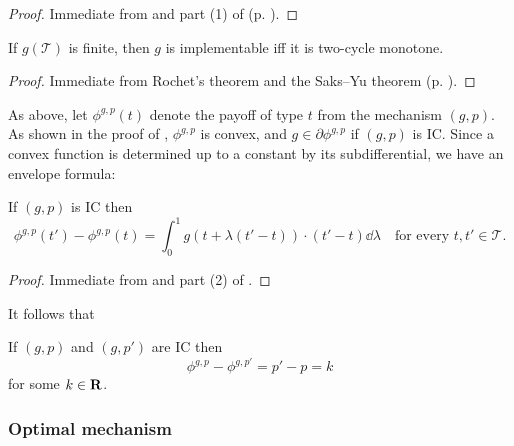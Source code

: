 \documentclass[11pt,letterpaper,reqno,oneside]{article}
\begin{document}
\begin{proof}
	Immediate from  and part (1) of  (p. \pageref{theorem:convex_FTC}).
\end{proof}


\begin{corollary}
	\label{theorem:implementable_monotone_2cycle}
	If $g(\mathcal{T})$ is finite, then $g$ is implementable iff it is two-cycle monotone.
\end{corollary}

\begin{proof}
	Immediate from Rochet's theorem and the Saks--Yu theorem (p. \pageref{theorem:SaksYu}).
\end{proof}


As above, let $\phi^{g,p}(t)$ denote the payoff of type $t$ from the mechanism $(g,p)$. As shown in the proof of , $\phi^{g,p}$ is convex, and $g \in \partial \phi^{g,p}$ if $(g,p)$ is IC. Since a convex function is determined up to a constant by its subdifferential, we have an envelope formula:
%
\begin{theorem}
	\label{theorem:IC_envelope}
	If $(g,p)$ is IC then
	\begin{equation*}
		\phi^{g,p}(t') - \phi^{g,p}(t) 
		= \int_0^1 g( t + \lambda(t'-t) ) \cdot (t'-t) \dd \lambda 
		\quad\text{for every $t,t' \in \mathcal{T}$} .
	\end{equation*}
\end{theorem}


\begin{proof}
	Immediate from  and part (2) of .
\end{proof}


It follows that
%
\begin{corollary}
	If $(g,p)$ and $(g,p')$ are IC then
	\begin{equation*}
		\phi^{g,p} - \phi^{g,p'} = p'-p = k
	\end{equation*}
	for some $k \in \mathbf{R}$.
\end{corollary}



\subsubsection{Optimal mechanism}
\label{sec:mech_desi:single_agent_multiple_dimensions:optimal_mech}
\end{document}
